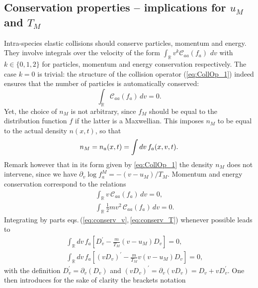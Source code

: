 \documentclass[11pt]{article}
\begin{document}
\subsection{Conservation properties -- implications for $u_M$ and $T_M$}\label{sub:cons_ppy}
Intra-species elastic collisions should conserve particles, momentum and energy. 
They involve integrals over the velocity of the form $\int_{\mathbb{R}} v^k \mathcal{C}_{aa}(f_a) \, \,d v$ with $k\in\{0,1,2\}$ for particles, momentum and energy conservation respectively. The case $k=0$ is trivial: the structure of the collision operator (\ref{eq:CollOp_1}) indeed ensures that the number of particles is automatically conserved:
%
\begin{equation} \label{eq:conserv_n}
\int_{\mathbb{R}} \mathcal{C}_{aa}(f_a) \,dv = 0.
\end{equation}
%
Yet, the choice of $n_M$ is not arbitrary, since $f_M$ should be equal to the distribution function $f$ if the latter is a Maxwellian. This imposes $n_M$ to be equal to the actual density $n(x,t)$, so that
%
\begin{equation} \label{eq:def_nM}
n_M = n_a(x,t) = \int dv \, f_a(x,v,t).\\
\end{equation}
%
Remark however that in its form given by \cref{eq:CollOp_1} the density $n_M$ does not intervene, since we have $\partial_{v}\operatorname{log} f_a^{M} = -(v-u_M)/T_M$. Momentum and energy conservation correspond to the relations
%
\begin{eqnarray}
&& \int_{\mathbb{R}} v\, \mathcal{C}_{aa}(f_a) \,d v = 0 \label{eq:conserv_v}, \\
&& \int_{\mathbb{R}} \frac{1}{2}mv^2\, \mathcal{C}_{aa}(f_a) \,d v = 0 \label{eq:conserv_T}.
\end{eqnarray}
%
Integrating by parts eqs.\,(\ref{eq:conserv_v},\,\ref{eq:conserv_T}) whenever possible
leads to
%
\begin{eqnarray}
&&  \int_{\mathbb{R}} d v\, f_a\left[ 
D_v^\prime - \frac{m}{T_M} (v-u_M)D_v \right] = 0 \label{eq:conserv_v2}, \\
&& \int_{\mathbb{R}} d v\, f_a\left[ 
(vD_v)^\prime - \frac{m}{T_M} v(v-u_M)D_v \right] = 0 \label{eq:conserv_T2},
\end{eqnarray}
%
with the definition $D_v^\prime = \partial_v (D_v)$ and $(vD_v)^\prime = \partial_v (vD_v) = D_v + vD_v^\prime$. 
One then introduces for the sake of clarity the brackets notation
\end{document}
